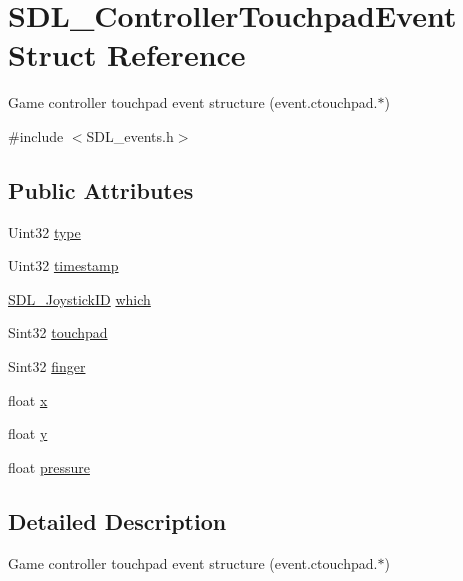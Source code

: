 \hypertarget{struct_s_d_l___controller_touchpad_event}{}\section{S\+D\+L\+\_\+\+Controller\+Touchpad\+Event Struct Reference}
\label{struct_s_d_l___controller_touchpad_event}


Game controller touchpad event structure (event.\+ctouchpad.$\ast$)  




{\ttfamily \#include $<$S\+D\+L\+\_\+events.\+h$>$}

\subsection*{Public Attributes}
\begin{DoxyCompactItemize}
\item 
Uint32 \mbox{\hyperlink{struct_s_d_l___controller_touchpad_event_ac33536046a3481953246b22a0371c109}{type}}
\item 
Uint32 \mbox{\hyperlink{struct_s_d_l___controller_touchpad_event_a2b80663393965edfc666f364f07631da}{timestamp}}
\item 
\mbox{\hyperlink{_s_d_l__joystick_8h_a3c3d32500cb08f76ee8077983912c0bd}{S\+D\+L\+\_\+\+Joystick\+ID}} \mbox{\hyperlink{struct_s_d_l___controller_touchpad_event_a0eccc1247f8924b2e495a2afd4f2daf4}{which}}
\item 
Sint32 \mbox{\hyperlink{struct_s_d_l___controller_touchpad_event_a47ebc5c7897b57bda7fe7c2fa553eb7f}{touchpad}}
\item 
Sint32 \mbox{\hyperlink{struct_s_d_l___controller_touchpad_event_a0e88fa90ee264c841170cf199a4e57c9}{finger}}
\item 
float \mbox{\hyperlink{struct_s_d_l___controller_touchpad_event_adb5d612ba132f5dc0278a27da9f2e310}{x}}
\item 
float \mbox{\hyperlink{struct_s_d_l___controller_touchpad_event_a7d7bb07fbb017e8d832f04a0bb80c333}{y}}
\item 
float \mbox{\hyperlink{struct_s_d_l___controller_touchpad_event_a63f7ea4e43a032d8a64c2022761ba5e1}{pressure}}
\end{DoxyCompactItemize}


\subsection{Detailed Description}
Game controller touchpad event structure (event.\+ctouchpad.$\ast$) 

